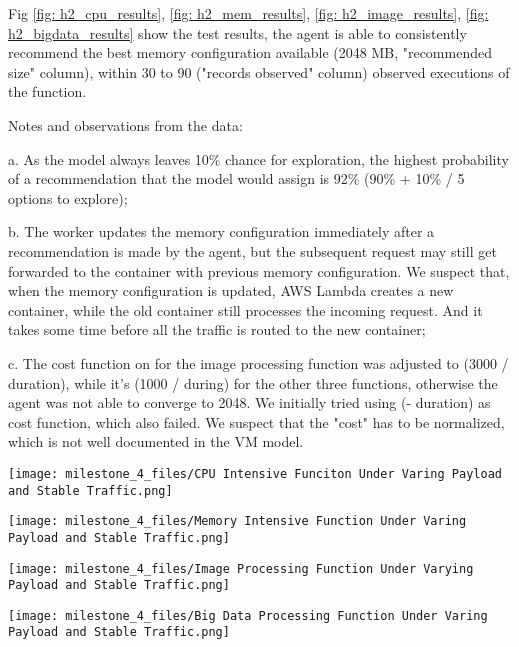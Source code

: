 \documentclass[conference]{IEEEtran}
\begin{document}
Fig \ref{fig: h2_cpu_results}, \ref{fig: h2_mem_results}, \ref{fig: h2_image_results}, \ref{fig: h2_bigdata_results} show the test results, the agent is able to consistently recommend the best memory configuration available (2048 MB, "recommended size" column), within 30 to 90 ("records observed" column) observed executions of the function. 

Notes and observations from the data:

a. As the model always leaves 10\% chance for exploration, the highest probability of a recommendation that the model would assign is 92\% (90\% + 10\% / 5 options to explore);

b. The worker updates the memory configuration immediately after a recommendation is made by the agent, but the subsequent request may still get forwarded to the container with previous memory configuration. We suspect that, when the memory configuration is updated, AWS Lambda creates a new container, while the old container still processes the incoming request. And it takes some time before all the traffic is routed to the new container;

c. The cost function on for the image processing function was adjusted to (3000 / duration), while it's (1000 / during) for the other three functions, otherwise the agent was not able to converge to 2048. We initially tried using (- duration) as cost function, which also failed. We suspect that the "cost" has to be normalized, which is not well documented in the VM model.

\begin{figure*}
    \centering
    \texttt{[image: milestone\_4\_files/CPU Intensive Funciton Under Varing Payload and Stable Traffic.png]}
    \caption{CPU Intensive Function Under Varying Payload and Stable Traffic}
    \label{fig: h2_cpu_results}
\end{figure*}
\begin{figure*}
    \centering
    \texttt{[image: milestone\_4\_files/Memory Intensive Function Under Varing Payload and Stable Traffic.png]}
    \caption{Memory Intensive Funciton Under Varing Payload and Stable Traffic}
    \label{fig: h2_mem_results}
\end{figure*}
\begin{figure*}
    \centering
    \texttt{[image: milestone\_4\_files/Image Processing Function Under Varying Payload and Stable Traffic.png]}
    \caption{Image Processing Function Under Varying Payload and Stable Traffic}
    \label{fig: h2_image_results}
\end{figure*}
\begin{figure*}
    \centering
    \texttt{[image: milestone\_4\_files/Big Data Processing Function Under Varing Payload and Stable Traffic.png]}
    \caption{Big Data Processing Function Under Varying Payload and Stable Traffic}
    \label{fig: h2_bigdata_results}
\end{figure*}
\end{document}

